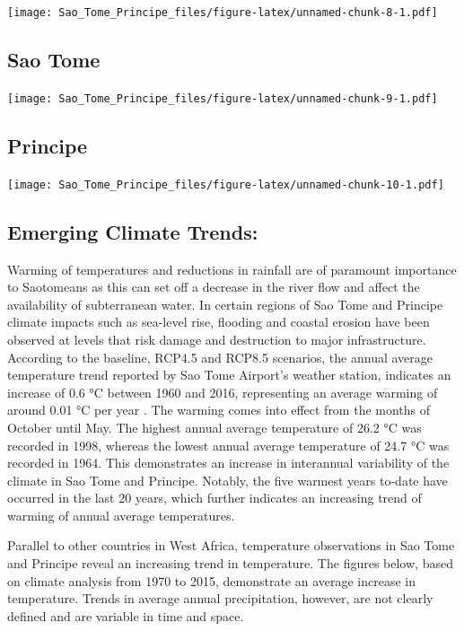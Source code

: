 \documentclass[
]{book}
\begin{document}
\texttt{[image: Sao\_Tome\_Principe\_files/figure-latex/unnamed-chunk-8-1.pdf]}

\hypertarget{sao-tome}{%
\subsection{Sao Tome}\label{sao-tome}}

\texttt{[image: Sao\_Tome\_Principe\_files/figure-latex/unnamed-chunk-9-1.pdf]}

\hypertarget{principe}{%
\subsection{Principe}\label{principe}}

\texttt{[image: Sao\_Tome\_Principe\_files/figure-latex/unnamed-chunk-10-1.pdf]}

\hypertarget{emerging-climate-trends}{%
\subsection{Emerging Climate Trends:}\label{emerging-climate-trends}}

Warming of temperatures and reductions in rainfall are of paramount importance to Saotomeans as this can set off a decrease in the river flow and affect the availability of subterranean water. In certain regions of Sao Tome and Principe climate impacts such as sea-level rise, flooding and coastal erosion have been observed at levels that risk damage and destruction to major infrastructure. According to the baseline, RCP4.5 and RCP8.5 scenarios, the annual average temperature trend reported by Sao Tome Airport's weather station, indicates an increase of 0.6 °C between 1960 and 2016, representing an average warming of around 0.01 °C per year . The warming comes into effect from the months of October until May. The highest annual average temperature of 26.2 °C was recorded in 1998, whereas the lowest annual average temperature of 24.7 °C was recorded in 1964. This demonstrates an increase in interannual variability of the climate in Sao Tome and Principe. Notably, the five warmest years to-date have occurred in the last 20 years, which further indicates an increasing trend of warming of annual average temperatures.

Parallel to other countries in West Africa, temperature observations in Sao Tome and Principe reveal an increasing trend in temperature. The figures below, based on climate analysis from 1970 to 2015, demonstrate an average increase in temperature. Trends in average annual precipitation, however, are not clearly defined and are variable in time and space.
\end{document}
